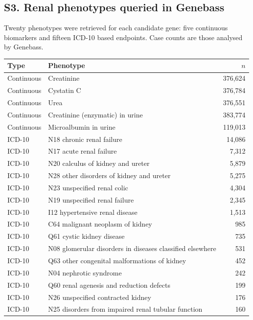 \documentclass[11pt,a4paper]{article}
\begin{document}
\subsection*{S3. Renal phenotypes queried in Genebass}

Twenty phenotypes were retrieved for each candidate gene: five continuous biomarkers and
fifteen ICD-10 based endpoints. Case counts are those analysed by Genebass.

\begin{table}[H]
\centering
\small
\begin{tabular}{llr}
\toprule
Type & Phenotype & $n$ \\
\midrule
Continuous & Creatinine & 376,624 \\
Continuous & Cystatin C & 376,784 \\
Continuous & Urea & 376,551 \\
Continuous & Creatinine (enzymatic) in urine & 383,774 \\
Continuous & Microalbumin in urine & 119,013 \\
\midrule
ICD-10 & N18 chronic renal failure & 14,086 \\
ICD-10 & N17 acute renal failure & 7,312 \\
ICD-10 & N20 calculus of kidney and ureter & 5,879 \\
ICD-10 & N28 other disorders of kidney and ureter & 5,275 \\
ICD-10 & N23 unspecified renal colic & 4,304 \\
ICD-10 & N19 unspecified renal failure & 2,345 \\
ICD-10 & I12 hypertensive renal disease & 1,513 \\
ICD-10 & C64 malignant neoplasm of kidney & 985 \\
ICD-10 & Q61 cystic kidney disease & 735 \\
ICD-10 & N08 glomerular disorders in diseases classified elsewhere & 531 \\
ICD-10 & Q63 other congenital malformations of kidney & 452 \\
ICD-10 & N04 nephrotic syndrome & 242 \\
ICD-10 & Q60 renal agenesis and reduction defects & 199 \\
ICD-10 & N26 unspecified contracted kidney & 176 \\
ICD-10 & N25 disorders from impaired renal tubular function & 160 \\
\bottomrule
\end{tabular}
\end{table}
\end{document}
